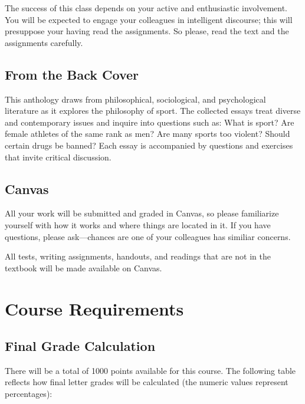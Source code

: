\documentclass{tufte-handout}
\begin{document}
The success of this class depends on your active and enthusiastic involvement. You will be expected to engage your colleagues in intelligent discourse; this will presuppose your having read the assignments. So please, read the text and the assignments carefully.

\subsection{From the Back Cover}
This anthology draws from philosophical, sociological, and psychological literature as it explores the philosophy of sport. The collected essays treat diverse and contemporary issues and inquire into questions such as: What is sport? Are female athletes of the same rank as men? Are many sports too violent? Should certain drugs be banned? Each essay is accompanied by questions and exercises that invite critical discussion.

\subsection{Canvas}
All your work will be submitted and graded in Canvas, so please familiarize yourself with how it works and where things are located in it. If you have questions, please ask---chances are one of your colleagues has similiar concerns.

All tests, writing assignments, handouts, and readings that are not in the textbook will be made available on Canvas.

\section{Course Requirements}
\subsection{Final Grade Calculation}
There will be a total of 1000 points available for this course. The following table reflects how final letter grades will be calculated (the numeric values represent percentages):
\end{document}
